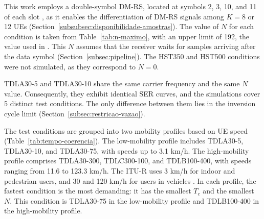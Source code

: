 This work employs a double-symbol DM-RS, located at symbols 2, 3, 10, and 11 of each slot \cite[Tab.~6.4.1.1.3-4]{3gpp-ts38211}, as it enables the differentiation of DM-RS signals among $K = 8$ or 12 UEs (Section~\ref{subsubsec:disponibilidade-amostras}). The value of $N$ for each condition is taken from Table~\ref{tab:n-maximo}, with an upper limit of 192, the value used in \cite{zhao2025jsac}. This $N$ assumes that the receiver waits for samples arriving after the data symbol (Section~\ref{subsec:pipeline}). The HST350 and HST500 conditions were not simulated, as they correspond to $N = 0$.

TDLA30-5 and TDLA30-10 share the same carrier frequency and the same $N$ value. Consequently, they exhibit identical SER curves, and the simulations cover 5 distinct test conditions. The only difference between them lies in the inversion cycle limit (Section~\ref{subsec:restricao-vazao}).

The test conditions are grouped into two mobility profiles based on UE speed (Table~\ref{tab:tempo-coerencia}). The low-mobility profile includes TDLA30-5, TDLA30-10, and TDLA30-75, with speeds up to 3.1 km/h. The high-mobility profile comprises TDLA30-300, TDLC300-100, and TDLB100-400, with speeds ranging from 11.6 to 123.3 km/h. The ITU-R uses 3 km/h for indoor and pedestrian users, and 30 and 120 km/h for users in vehicles \cite[Sec.~8.2 and Tab.~5]{itu-m2412}. In each profile, the fastest condition is the most demanding: it has the smallest $T_c$ and the smallest $N$. This condition is TDLA30-75 in the low-mobility profile and TDLB100-400 in the high-mobility profile.

